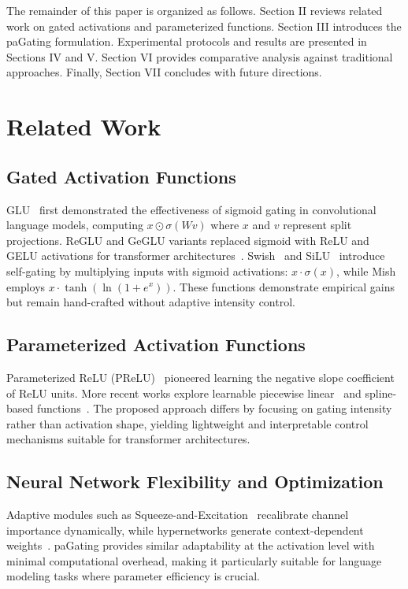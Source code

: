 \documentclass[lettersize,journal]{IEEEtran}
\begin{document}
The remainder of this paper is organized as follows. Section II reviews related work on gated activations and parameterized functions. Section III introduces the paGating formulation. Experimental protocols and results are presented in Sections IV and V. Section VI provides comparative analysis against traditional approaches. Finally, Section VII concludes with future directions.

\section{Related Work}

\subsection{Gated Activation Functions}
GLU~\cite{dauphin2017language} first demonstrated the effectiveness of sigmoid gating in convolutional language models, computing $x \odot \sigma(Wv)$ where $x$ and $v$ represent split projections. ReGLU and GeGLU variants replaced sigmoid with ReLU and GELU activations for transformer architectures~\cite{shazeer2020glu}. Swish~\cite{ramachandran2017searching} and SiLU~\cite{elfwing2017sigmoid} introduce self-gating by multiplying inputs with sigmoid activations: $x \cdot \sigma(x)$, while Mish~\cite{misra2019mish} employs $x \cdot \tanh(\ln(1+e^x))$. These functions demonstrate empirical gains but remain hand-crafted without adaptive intensity control.

\subsection{Parameterized Activation Functions}
Parameterized ReLU (PReLU)~\cite{he2015delving} pioneered learning the negative slope coefficient of ReLU units. More recent works explore learnable piecewise linear~\cite{agostinelli2014learning} and spline-based functions~\cite{scardapane2017kafnets}. The proposed approach differs by focusing on gating intensity rather than activation shape, yielding lightweight and interpretable control mechanisms suitable for transformer architectures.

\subsection{Neural Network Flexibility and Optimization}
Adaptive modules such as Squeeze-and-Excitation~\cite{hu2018squeeze} recalibrate channel importance dynamically, while hypernetworks generate context-dependent weights~\cite{ha2016hypernetworks}. paGating provides similar adaptability at the activation level with minimal computational overhead, making it particularly suitable for language modeling tasks where parameter efficiency is crucial.
\end{document}
